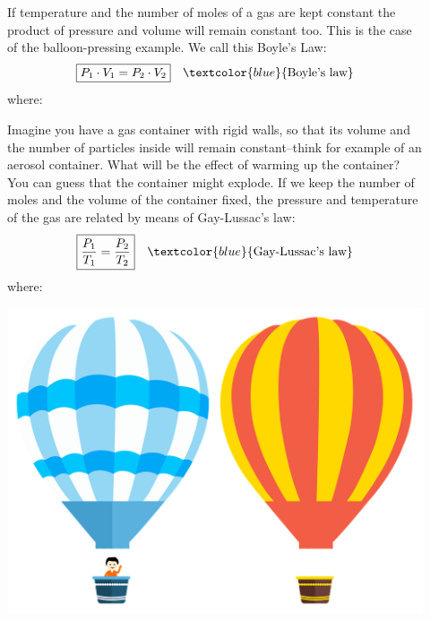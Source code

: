 \documentclass[main.tex]{subfiles}
\begin{document}
\begin{description}
\item[] 
If temperature and the number of moles of a gas are kept constant the product of pressure and volume will remain constant too. This is the case of the balloon-pressing example. We call this Boyle's Law:
\begin{equation*}
\boxed{  P_1\cdot V_1=P_2\cdot V_2} \quad \textcolor{blue}{\text{Boyle's law}}
\end{equation*}
where:
\item[] 
Imagine you have a gas container with rigid walls, so that its volume and the number of particles inside will remain constant--think for example of an aerosol container. What will be the effect of warming up the container? You can guess that the container might explode. If we keep the number of moles and the volume of the container fixed, the pressure and temperature of the gas are related by means of  Gay-Lussac's law:
\begin{equation*}
\boxed{  \frac{P_1} {T_1}=\frac{P_2} {T_2}} \quad \textcolor{blue}{\text{Gay-Lussac's law}}
\end{equation*}
where:
\begin{marginfigure}[0cm]%
\includegraphics {chapter8/figure7}

\end{marginfigure}
\end{description}
\end{document}
